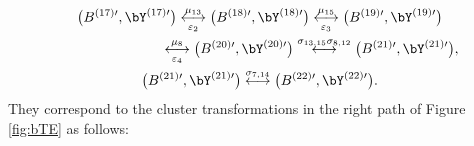 \begin{gather}
\bigl(B^{(17)\prime}, \bY^{(17)\prime}\bigr) \underset{\varepsilon_2}{\overset{\mu_{13}}{\longleftrightarrow} }
\bigl(B^{(18)\prime}, \bY^{(18)\prime}\bigr) \underset{\varepsilon_3}{\overset{\mu_{15}}{\longleftrightarrow} }
\bigl(B^{(19)\prime}, \bY^{(19)\prime}\bigr)\nonumber
\\
\phantom{\bigl(B^{(16)\prime}, \bY^{(16)\prime}\bigr)}{}
\underset{\varepsilon_4}{\overset{\mu_{8}}{\longleftrightarrow} }
\bigl(B^{(20)\prime}, \bY^{(20)\prime}\bigr) \overset{\sigma_{13,15}\sigma_{8,12}}{\longleftrightarrow}
\bigl(B^{(21)\prime}, \bY^{(21)\prime}\bigr),\nonumber
\\
\bigl(B^{(21)\prime}, \bY^{(21)\prime}\bigr) \overset{\sigma_{7,14}}{\longleftrightarrow}
\bigl(B^{(22)\prime}, \bY^{(22)\prime}\bigr).\label{b11R}
\end{gather}
They correspond to the cluster transformations in the right path of Figure \ref{fig:bTE} as follows:
